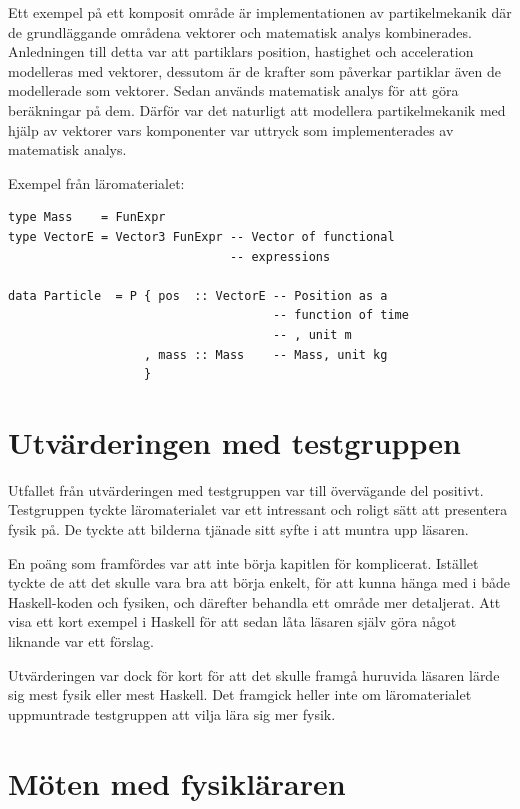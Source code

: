 Ett exempel på ett komposit område är implementationen av partikelmekanik
där de grundläggande områdena vektorer och matematisk analys
kombinerades. Anledningen till detta var att partiklars position, hastighet och
acceleration modelleras med vektorer, dessutom är de krafter som påverkar
partiklar även de modellerade som vektorer. Sedan används matematisk analys för
att göra beräkningar på dem. Därför var det naturligt att modellera
partikelmekanik med hjälp av vektorer vars komponenter var uttryck som
implementerades av matematisk analys.

Exempel från läromaterialet:
\begin{lstlisting}[frame=none, belowskip=-0.5\baselineskip, xleftmargin=0.5in]
type Mass    = FunExpr
type VectorE = Vector3 FunExpr -- Vector of functional
                               -- expressions

data Particle  = P { pos  :: VectorE -- Position as a
                                     -- function of time
                                     -- , unit m
                   , mass :: Mass    -- Mass, unit kg
                   }
\end{lstlisting}

\section{Utvärderingen med testgruppen}\label{sec:res_test}

Utfallet från utvärderingen med testgruppen var till övervägande del positivt.
Testgruppen tyckte läromaterialet var ett intressant och roligt sätt att
presentera fysik på. De tyckte att bilderna tjänade sitt syfte i att muntra upp
läsaren. 

En poäng som framfördes var att inte börja kapitlen för komplicerat. Istället
tyckte de att det skulle vara bra att börja enkelt, för att kunna hänga med i
både Haskell-koden och fysiken, och därefter behandla ett område mer
detaljerat. Att visa ett kort exempel i Haskell för att sedan låta läsaren själv
göra något liknande var ett förslag.

Utvärderingen var dock för kort för att det skulle framgå huruvida läsaren lärde
sig mest fysik eller mest Haskell. Det framgick heller inte om läromaterialet
uppmuntrade testgruppen att vilja lära sig mer fysik.

\section{Möten med fysikläraren}\label{sec:res_ake}

